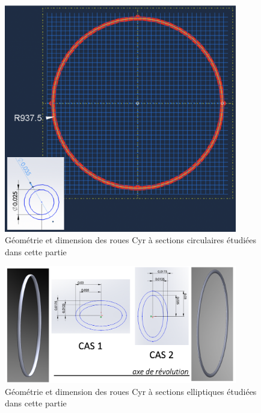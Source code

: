 \begin{figure}[htb]
\centering
\includegraphics[width=4in]{images_2ddl/geo1.png}
\caption{Géométrie et dimension des roues Cyr à sections circulaires étudiées dans cette partie}
\label{fig:geo1}
\end{figure}

\begin{figure}[htb]
\centering
\includegraphics[width=4in]{images_2ddl/geo2.png}
\caption{Géométrie et dimension des roues Cyr à sections elliptiques étudiées dans cette partie}
\label{fig:geo2}
\end{figure}



